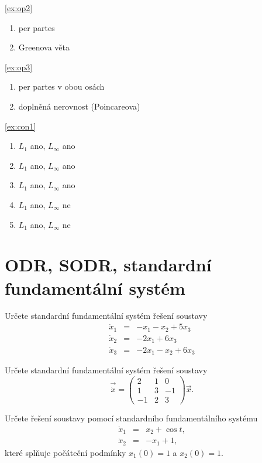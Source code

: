\documentclass[a4paper,10pt]{book}
\begin{document}
\ref{ex:op2} 
\begin{enumerate}[label=\alph*), itemsep=-5pt, topsep=-7pt]
  \item per partes
  \item Greenova věta
\end{enumerate}

\ref{ex:op3}
\begin{enumerate}[label=\alph*), itemsep=-5pt, topsep=-7pt]
  \item per partes v obou osách
  \item doplněná nerovnost (Poincareova)
\end{enumerate}

\ref{ex:con1}
\begin{enumerate}[label=\alph*), itemsep=-3pt, topsep=-7pt]
  \item $L_1$ ano, $L_\infty$ ano
  \item $L_1$ ano, $L_\infty$ ano
  \item $L_1$ ano, $L_\infty$ ano
  \item $L_1$ ano, $L_\infty$ ne
  \item $L_1$ ano, $L_\infty$ ne
\end{enumerate}


\chapter{ODR, SODR, standardní fundamentální systém}

\exercise \label{ex:ode1} Určete standardní fundamentální systém řešení soustavy
\begin{eqnarray*}
\dot{x}_1 &=& -x_1  - x_2 + 5x_3 \\
\dot{x}_2 &=& -2x_1       + 6x_3 \\
\dot{x}_3 &=& -2x_1 - x_2 + 6x_3 
\end{eqnarray*}

\exercise \label{ex:ode2} Určete standardní fundamentální systém řešení soustavy
\begin{equation*}
\vec{\dot{x}} = \begin{pmatrix} 2 & 1 & 0 \\ 1 & 3 & -1 \\ -1 & 2 & 3 \end{pmatrix} \vec{x}.
\end{equation*}

\exercise \label{ex:ode3} Určete řešení soustavy pomocí standardního fundamentálního systému
\begin{eqnarray*}
\dot{x}_1 &=& x_2  + \cos t, \\
\dot{x}_2 &=& -x_1 + 1, 
\end{eqnarray*}
které splňuje počáteční podmínky $x_1(0)=1$ a $x_2(0)=1$.
\end{document}
